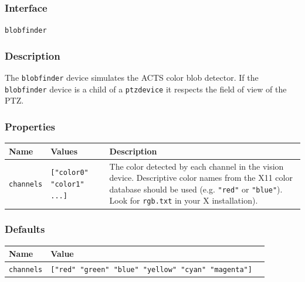 \documentclass[11pt,twoside]{report}
\begin{document}
\subsubsection*{Interface}
{\tt blobfinder}

\subsubsection*{Description}
The \verb'blobfinder' device simulates the ACTS color blob
detector. If the \verb'blobfinder' device is a child of a
\verb'ptzdevice' it respects the field of view of the PTZ.

\subsubsection*{Properties}
\begin{tabularx}{\columnwidth}{llX}
\hline
Name & Values & Description \\
\hline
\verb'channels' & \verb'["color0" "color1" ...]' & The
color detected by each channel in the vision device.  Descriptive
color names from the X11 color database should be used
(e.g. \verb'"red"' or \verb'"blue"').  Look for \verb'rgb.txt' in your
X installation).\\
\hline
\end{tabularx}

\subsubsection*{Defaults}
\begin{tabularx}{\columnwidth}{llX}
\hline
Name & Value\\
\hline
\verb'channels' & \verb'["red" "green" "blue" "yellow" "cyan" "magenta"]'\\
\hline
\end{tabularx}



\end{document}
